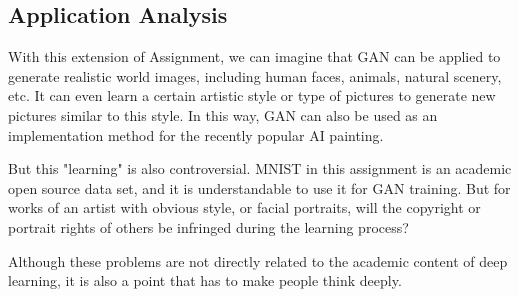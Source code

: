 \documentclass{article}
\begin{document}
\subsection{Application Analysis}

With this extension of Assignment, we can imagine that GAN can be applied to generate realistic world images, including human faces, animals, natural scenery, etc. It can even learn a certain artistic style or type of pictures to generate new pictures similar to this style. In this way, GAN can also be used as an implementation method for the recently popular AI painting.

But this "learning" is also controversial. MNIST in this assignment is an academic open source data set, and it is understandable to use it for GAN training. But for works of an artist with obvious style, or facial portraits, will the copyright or portrait rights of others be infringed during the learning process?

Although these problems are not directly related to the academic content of deep learning, it is also a point that has to make people think deeply.




\newpage
\end{document}
